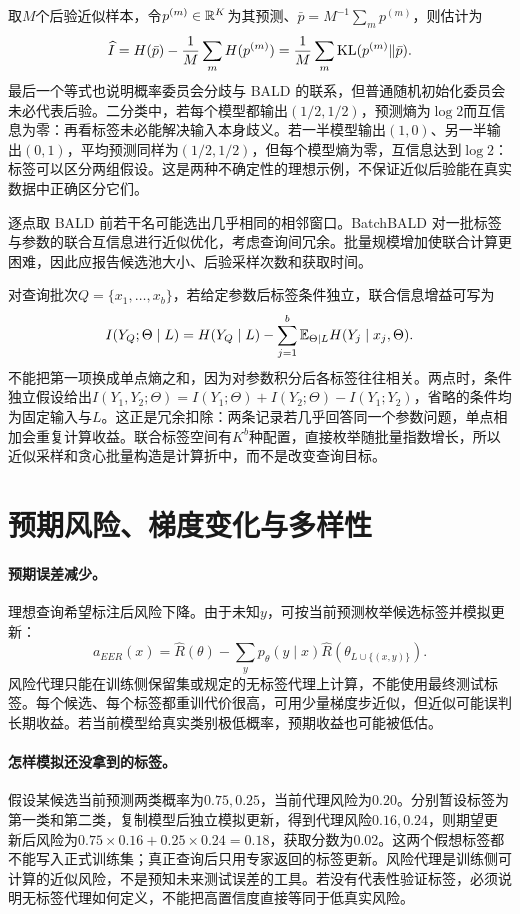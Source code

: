 取$M$个后验近似样本，令$p^{(m)}\in\mathbb{R}^K$为其预测、$\bar p=M^{-1}\sum_mp^{(m)}$，则估计为
\begin{equation}
 \widehat I=H(\bar p)-\frac1M\sum_mH(p^{(m)})
 =\frac1M\sum_m\operatorname{KL}(p^{(m)}\|\bar p).
\end{equation}
最后一个等式也说明概率委员会分歧与 BALD 的联系，但普通随机初始化委员会未必代表后验。二分类中，若每个模型都输出$(1/2,1/2)$，预测熵为$\log2$而互信息为零：再看标签未必能解决输入本身歧义。若一半模型输出$(1,0)$、另一半输出$(0,1)$，平均预测同样为$(1/2,1/2)$，但每个模型熵为零，互信息达到$\log2$：标签可以区分两组假设。这是两种不确定性的理想示例，不保证近似后验能在真实数据中正确区分它们。

逐点取 BALD 前若干名可能选出几乎相同的相邻窗口。BatchBALD 对一批标签与参数的联合互信息进行近似优化，考虑查询间冗余\cite{kirsch2019batchbald}。批量规模增加使联合计算更困难，因此应报告候选池大小、后验采样次数和获取时间。

对查询批次$Q=\{x_1,\ldots,x_b\}$，若给定参数后标签条件独立，联合信息增益可写为
\begin{equation}
 I(Y_Q;\Theta\mid L)=H(Y_Q\mid L)-\sum_{j=1}^b\mathbb{E}_{\Theta\mid L}H(Y_j\mid x_j,\Theta).
\end{equation}
不能把第一项换成单点熵之和，因为对参数积分后各标签往往相关。两点时，条件独立假设给出$I(Y_1,Y_2;\Theta)=I(Y_1;\Theta)+I(Y_2;\Theta)-I(Y_1;Y_2)$，省略的条件均为固定输入与$L$。这正是冗余扣除：两条记录若几乎回答同一个参数问题，单点相加会重复计算收益。联合标签空间有$K^b$种配置，直接枚举随批量指数增长，所以近似采样和贪心批量构造是计算折中，而不是改变查询目标。

\section{预期风险、梯度变化与多样性}
\paragraph{预期误差减少。}
理想查询希望标注后风险下降。由于未知$y$，可按当前预测枚举候选标签并模拟更新\cite{roy2001error}：
\begin{equation}
 a_{EER}(x)=\widehat R(\theta)
 -\sum_yp_\theta(y\mid x)\widehat R(\theta_{L\cup\{(x,y)\}}).
\end{equation}
风险代理只能在训练侧保留集或规定的无标签代理上计算，不能使用最终测试标签。每个候选、每个标签都重训代价很高，可用少量梯度步近似，但近似可能误判长期收益。若当前模型给真实类别极低概率，预期收益也可能被低估。

\paragraph{怎样模拟还没拿到的标签。}
假设某候选当前预测两类概率为$0.75,0.25$，当前代理风险为$0.20$。分别暂设标签为第一类和第二类，复制模型后独立模拟更新，得到代理风险$0.16,0.24$，则期望更新后风险为$0.75\times0.16+0.25\times0.24=0.18$，获取分数为$0.02$。这两个假想标签都不能写入正式训练集；真正查询后只用专家返回的标签更新。风险代理是训练侧可计算的近似风险，不是预知未来测试误差的工具。若没有代表性验证标签，必须说明无标签代理如何定义，不能把高置信度直接等同于低真实风险。

